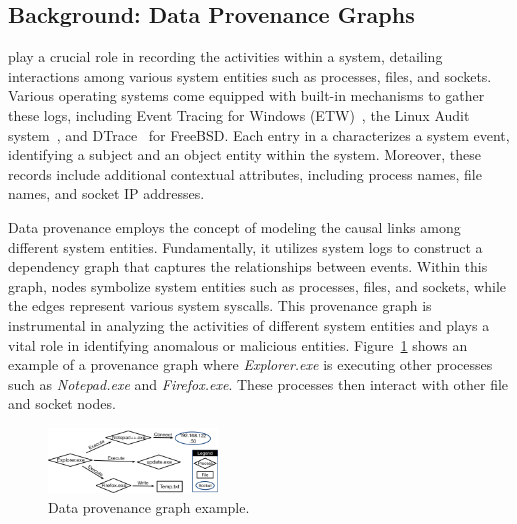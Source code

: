 
\subsection{Background: Data Provenance Graphs}




\Logs play a crucial role in recording the activities within a system, detailing interactions among various system entities such as processes, files, and sockets. Various operating systems come equipped with built-in mechanisms to gather these logs, including Event Tracing for Windows (ETW)~\cite{windowsaudit}, the Linux Audit system~\cite{linuxaudit}, and DTrace~\cite{dtrace} for FreeBSD. Each entry in a \logs characterizes a system event, identifying a subject and an object entity within the system. Moreover, these records include additional contextual attributes, including process names, file names, and socket IP addresses.

Data provenance employs the concept of modeling the causal links among different system entities. Fundamentally, it utilizes system logs to construct a dependency graph that captures the relationships between events. Within this graph, nodes symbolize system entities such as processes, files, and sockets, while the edges represent various system syscalls. This provenance graph is instrumental in analyzing the activities of different system entities and plays a vital role in identifying anomalous or malicious entities. Figure~\ref{provexp} shows an example of a provenance graph where \textit{Explorer.exe} is executing other processes such as \textit{Notepad.exe} and \textit{Firefox.exe}. These processes then interact with other file and socket nodes.

\begin{figure}[t!]
  \centering
  \includegraphics[width=0.4\textwidth]{fig/provexp.pdf}
  \caption{Data provenance graph example.}

  \label{provexp}
  \vspace{-2ex}
\end{figure}


